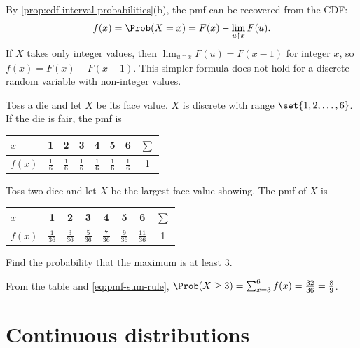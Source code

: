 \begin{remark}\label{rem:pmf-from-cdf}
By \cref{prop:cdf-interval-probabilities}(b), the pmf can be recovered from the CDF:
\[
  f(x) = \Prob(X = x) = F(x) - \lim_{u \uparrow x} F(u).
\]
If $X$ takes only integer values, then $\lim_{u \uparrow x} F(u) = F(x - 1)$ for integer $x$, so $f(x) = F(x) - F(x - 1)$. This simpler formula does not hold for a discrete random variable with non-integer values.
\end{remark}

\begin{example}\label{ex:tossing-a-die}
Toss a die and let $X$ be its face value. $X$ is discrete with range $\set{1, 2, \ldots, 6}$. If the die is fair, the pmf is
\begin{center}
\begin{tabular}{@{}l*{6}{c}c@{}}
\toprule
$x$ & 1 & 2 & 3 & 4 & 5 & 6 & $\sum$ \\
\midrule
$f(x)$ & $\frac16$ & $\frac16$ & $\frac16$ & $\frac16$ & $\frac16$ & $\frac16$ & 1 \\
\bottomrule
\end{tabular}
\end{center}
\end{example}

\begin{example}\label{ex:max-two-dice}
Toss two dice and let $X$ be the largest face value showing. The pmf of $X$ is
\begin{center}
\begin{tabular}{@{}l*{6}{c}c@{}}
\toprule
$x$ & 1 & 2 & 3 & 4 & 5 & 6 & $\sum$ \\
\midrule
$f(x)$ & $\frac{1}{36}$ & $\frac{3}{36}$ & $\frac{5}{36}$ & $\frac{7}{36}$ & $\frac{9}{36}$ & $\frac{11}{36}$ & 1 \\
\bottomrule
\end{tabular}
\end{center}
Find the probability that the maximum is at least $3$.
\end{example}

\begin{solution}
From the table and \eqref{eq:pmf-sum-rule}, $\Prob(X \ge 3) = \sum_{x=3}^{6} f(x) = \frac{32}{36} = \frac89$.
\end{solution}

\section{Continuous distributions}\label{sec:continuous-distributions}

